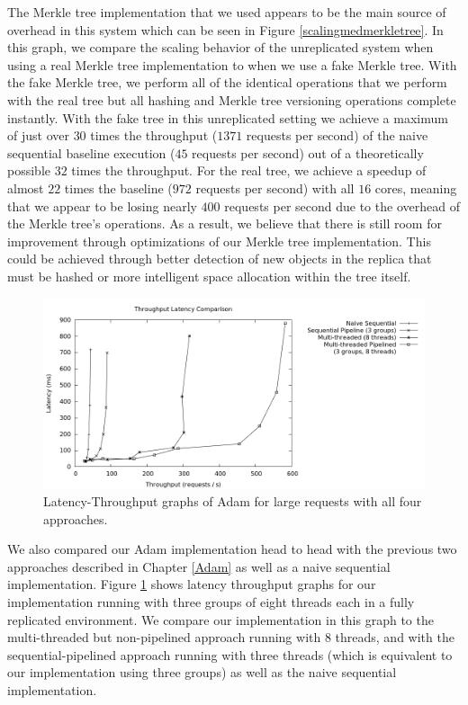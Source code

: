 \documentclass[11pt, oneside]{report}
\begin{document}
The Merkle tree implementation that we used appears to be the main source of overhead in this system which can be seen in Figure \ref{scalingmedmerkletree}. 
In this graph, we compare the scaling behavior of the unreplicated system when using a real Merkle tree implementation to when we use a fake Merkle tree.
With the fake Merkle tree, we perform all of the identical operations that we perform with the real tree but all hashing and Merkle tree versioning operations complete instantly.
With the fake tree in this unreplicated setting we achieve a maximum of just over $30$ times the throughput ($1371$ requests per second) of the naive sequential baseline execution ($45$ requests per second) out of a theoretically possible $32$ times the throughput.
For the real tree, we achieve a speedup of almost $22$ times the baseline ($972$ requests per second) with all $16$ cores, meaning that we appear to be losing nearly $400$ requests per second due to the overhead of the Merkle tree's operations.
As a result, we believe that there is still room for improvement through optimizations of our Merkle tree implementation.
This could be achieved through better detection of new objects in the replica that must be hashed or more intelligent space allocation within the tree itself.

\begin{figure}[h]
\centering
\includegraphics[width=1.0\textwidth]{graphs/latencythroughput/graph.png}
\caption{\label{head2head}Latency-Throughput graphs of Adam for large requests with all four approaches.}
\end{figure}

We also compared our Adam implementation head to head with the previous two approaches described in Chapter \ref{Adam} as well as a naive sequential implementation. 
Figure \ref{head2head} shows latency throughput graphs for our implementation running with three groups of eight threads each in a fully replicated environment. 
We compare our implementation in this graph to the multi-threaded but non-pipelined approach running with 8 threads, and with the sequential-pipelined approach running with three threads (which is equivalent to our implementation using three groups) as well as the naive sequential implementation. 
\end{document}
